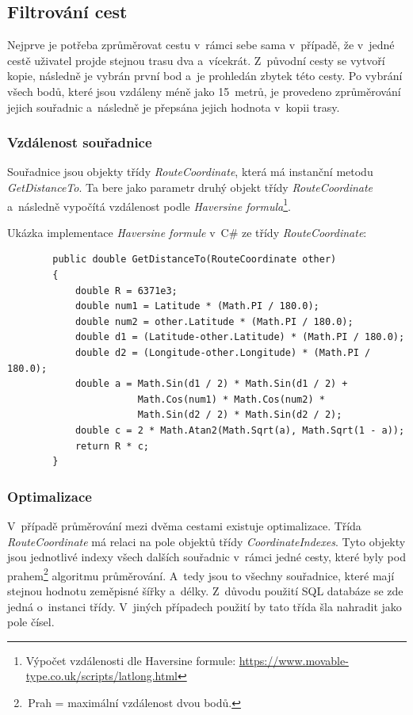 \subsection{Filtrování cest}

Nejprve je potřeba zprůměrovat cestu v~rámci sebe sama v~případě, že v~jedné cestě uživatel projde stejnou trasu dva a~vícekrát. Z~původní cesty se vytvoří kopie, následně je vybrán první bod a~je prohledán zbytek této cesty. Po vybrání všech bodů, které jsou vzdáleny méně jako 15~metrů, je provedeno zprůměrování jejich souřadnic a~následně je přepsána jejich hodnota v~kopii trasy.  

\subsubsection{Vzdálenost souřadnice}
Souřadnice jsou objekty třídy \emph{RouteCoordinate}, která má instanční metodu \emph{GetDistanceTo}. Ta bere jako parametr druhý objekt třídy \emph{RouteCoordinate} a~následně vypočítá vzdálenost podle \emph{Haversine formula}\footnote{Výpočet vzdálenosti dle Haversine formule:
\url{https://www.movable-type.co.uk/scripts/latlong.html}}.

Ukázka implementace \emph{Haversine formule} v~C\# ze třídy \emph{RouteCoordinate}:
\begin{verbatim}
        public double GetDistanceTo(RouteCoordinate other)
        {
            double R = 6371e3;
            double num1 = Latitude * (Math.PI / 180.0);
            double num2 = other.Latitude * (Math.PI / 180.0);
            double d1 = (Latitude-other.Latitude) * (Math.PI / 180.0);
            double d2 = (Longitude-other.Longitude) * (Math.PI / 180.0);
            double a = Math.Sin(d1 / 2) * Math.Sin(d1 / 2) +
                       Math.Cos(num1) * Math.Cos(num2) *
                       Math.Sin(d2 / 2) * Math.Sin(d2 / 2);
            double c = 2 * Math.Atan2(Math.Sqrt(a), Math.Sqrt(1 - a));
            return R * c;
        }
\end{verbatim}


\subsubsection{Optimalizace}
V~případě průměrování mezi dvěma cestami existuje optimalizace. Třída \emph{RouteCoordinate} má relaci na pole objektů třídy \emph{CoordinateIndexes}. Tyto objekty jsou jednotlivé indexy všech dalších souřadnic v~rámci jedné cesty, které byly pod prahem\footnote{\,Prah = maximální vzdálenost dvou bodů.} algoritmu průměrování. A~tedy jsou to všechny souřadnice, které mají stejnou hodnotu zeměpisné šířky a~délky. Z~důvodu použití SQL databáze se zde jedná o~instanci třídy. V~jiných případech použití by tato třída šla nahradit jako pole čísel.

